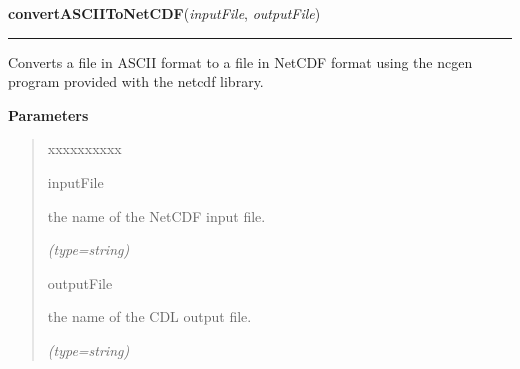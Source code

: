     \label{nMOLDYN:Core:IOFiles:convertASCIIToNetCDF}

    \vspace{0.5ex}

\hspace{.8\funcindent}\begin{boxedminipage}{\funcwidth}

    \raggedright \textbf{convertASCIIToNetCDF}(\textit{inputFile}, \textit{outputFile})

    \vspace{-1.5ex}

    \rule{\textwidth}{0.5\fboxrule}
\setlength{\parskip}{2ex}
    Converts a file in ASCII format to a file in NetCDF format using the 
    ncgen program provided with the netcdf library.

\setlength{\parskip}{1ex}
      \textbf{Parameters}
      \vspace{-1ex}

      \begin{quote}
        \begin{Ventry}{xxxxxxxxxx}

          \item[inputFile]

          the name of the NetCDF input file.

            {\it (type=string)}

          \item[outputFile]

          the name of the CDL output file.

            {\it (type=string)}

        \end{Ventry}

      \end{quote}

    \end{boxedminipage}



